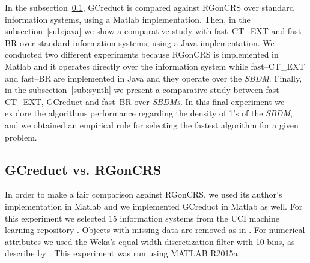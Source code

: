 \documentclass[authoryear,preprint,review,12pt]{elsarticle}
\begin{document}
	In the subsection~\ref{sub:matlab}, GCreduct is compared against RGonCRS over standard information systems, using a Matlab implementation. Then, in the subsection~\ref{sub:java} we show a comparative study with fast--CT\_EXT and fast--BR over standard information systems, using a Java implementation. We conducted two different experiments because RGonCRS is implemented in Matlab and it operates directly over the information system while fast--CT\_EXT and fast--BR are implemented in Java and they operate over the \textit{SBDM}. Finally, in the subsection~\ref{sub:synth} we present a comparative study between fast--CT\_EXT, GCreduct and fast--BR over \textit{SBDMs}. In this final experiment we explore the algorithms performance regarding the density of 1's of the \textit{SBDM}, and we obtained an empirical rule for selecting the fastest algorithm for a given problem.
	
\subsection{GCreduct vs. RGonCRS}\label{sub:matlab}
	In order to make a fair comparison against RGonCRS, we used its author's implementation in Matlab and we implemented GCreduct in Matlab as well. For this experiment we selected 15 information systems from the UCI machine learning repository \citep{Bache13}. Objects with missing data are removed as in \citep{WangP07}. For numerical attributes we used the Weka's equal width discretization filter with 10 bins, as describe by \cite{Flores2010}. This experiment was run using MATLAB R2015a.
	
\end{document}

